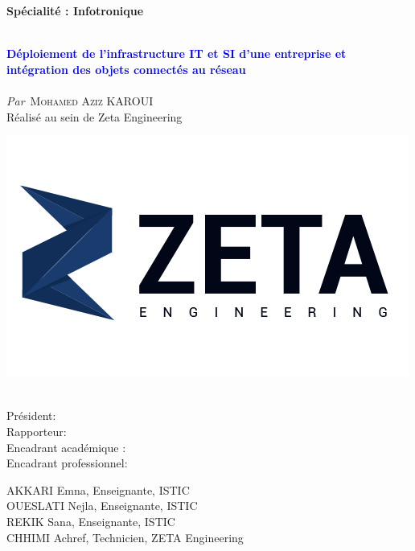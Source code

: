 \begin{titlepage}

\textbf{Spécialité : Infotronique }

\vskip1cm%


\HRule \\[0.4cm]
\textcolor{blue}{ \LARGE \bfseries Déploiement de l'infrastructure IT et SI d'une entreprise et intégration des objets connectés au réseau}\\[0.3cm] %
\HRule \\[1cm]


\textit{Par}\
\textsc{\large Mohamed Aziz KAROUI}\\[0.5cm] %


{Réalisé au sein de Zeta Engineering}\\
\smallskip

\includegraphics[width=0.4\columnwidth]{Images/logo-zeta.png}\

 


 \begin{center}

\begin{minipage}[c]{0.3\columnwidth}
Président:\\
Rapporteur:\\
Encadrant académique :\\
Encadrant professionnel:
\end{minipage}
\begin{minipage}[c]{0.6\columnwidth}
AKKARI Emna, Enseignante, ISTIC\\
OUESLATI Nejla, Enseignante, ISTIC\\
REKIK Sana, Enseignante, ISTIC\\
CHHIMI Achref, Technicien, ZETA Engineering
\end{minipage}



\end{center}
\end{titlepage}
